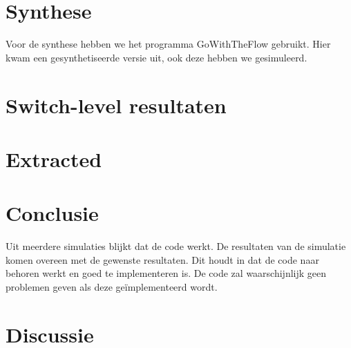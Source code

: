 \documentclass{scrartcl} %
\begin{document}
\section{Synthese}
Voor de synthese hebben we het programma GoWithTheFlow gebruikt. Hier kwam een gesynthetiseerde versie uit, ook deze hebben we gesimuleerd.
\section{Switch-level resultaten}
\section{Extracted}
\section{Conclusie}
Uit meerdere simulaties blijkt dat de code werkt. De resultaten van de simulatie komen overeen met de gewenste resultaten. Dit houdt in dat de code naar behoren werkt en goed te implementeren is. De code zal waarschijnlijk geen problemen geven als deze geïmplementeerd wordt.
\section{Discussie}
\end{document}

